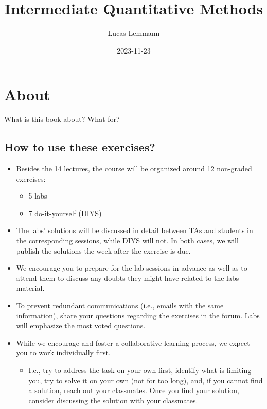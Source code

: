 \documentclass[
]{book}
\title{Intermediate Quantitative Methods}
\author{Lucas Lemmann}
\date{2023-11-23}
\providecommand{\tightlist}{%
  \setlength{\itemsep}{0pt}\setlength{\parskip}{0pt}}
\begin{document}
\maketitle

{
\setcounter{tocdepth}{1}
\tableofcontents
}
\hypertarget{about}{%
\chapter*{About}\label{about}}

What is this book about? What for?

\hypertarget{how-to-use-these-exercises}{%
\section{How to use these exercises?}\label{how-to-use-these-exercises}}

\begin{itemize}
\tightlist
\item
  Besides the 14 lectures, the course will be organized around 12 non-graded exercises:

  \begin{itemize}
  \tightlist
  \item
    5 labs
  \item
    7 do-it-yourself (DIYS)
  \end{itemize}
\item
  The labs' solutions will be discussed in detail between TAs and students in the corresponding sessions, while DIYS will not. In both cases, we will publish the solutions the week after the exercise is due.
\item
  We encourage you to prepare for the lab sessions in advance as well as to attend them to discuss any doubts they might have related to the labs material.
\item
  To prevent redundant communications (i.e., emails with the same information), share your questions regarding the exercises in the forum. Labs will emphasize the most voted questions.
\item
  While we encourage and foster a collaborative learning process, we expect you to work individually first.

  \begin{itemize}
  \tightlist
  \item
    I.e., try to address the task on your own first, identify what is limiting you, try to solve it on your own (not for too long), and, if you cannot find a solution, reach out your classmates. Once you find your solution, consider discussing the solution with your classmates.
  \end{itemize}
\end{itemize}
\end{document}
